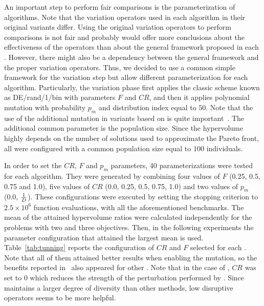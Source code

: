 %
%
%
%
%

An important step to perform fair comparisons is the parameterization of algorithms.
%
Note that the variation operators used in each algorithm in their original variants differ.
%
Using the original variation operators to perform comparisons is not fair and probably would offer more conclusions 
about the effectiveness of the operators than about the general framework proposed in each \MOEA{}.
%
However, there might also be a dependency between the general framework and the proper variation operators.
%
Thus, we decided to use a common simple framework for the variation step but allow different parameterization
for each algorithm.
%
Particularly, the variation phase first applies the classic \DE{} scheme known as DE/rand/1/bin with parameters $F$
and $CR$, and then it applies polynomial mutation with probability $p_m$
and distribution index equal to $50$.
%
Note that the use of the additional mutation in variants based on \MOEAD{} is quite important~\cite{zhang2009performance}.
%
The additional common parameter is the population size.
%
Since the hypervolume highly depends on the number of solutions used to approximate the Pareto front,
all \MOEAS{} were configured with a common population size equal to $100$ individuals.

In order to set the $CR$, $F$ and $p_m$ parameters, 40 parameterizations were tested for each algorithm.
%
They were generated by combining four values of $F$ (0.25, 0.5, 0.75 and 1.0), five values of $CR$ (0.0, 0.25, 0.5, 0.75, 1.0) 
and two values of $p_m$ (0.0, $1\over{D}$).
%
These configurations were executed by setting the stopping criterion to $2.5 \times 10^{6}$ function evaluations, 
with all the aforementioned benchmarks.
%
The mean of the attained hypervolume ratios were calculated independently for the problems with two and three objectives.
%
Then, in the following experiments the parameter configuration that attained the largest mean is used.
%
Table~\ref{tab:tunning} reports the configuration of $CR$ and $F$ selected for each \MOEA{}.
%
Note that all of them attained better results when enabling the mutation, so the benefits reported in~\cite{zhang2009performance}
also appeared for other \MOEAS{}.
%
Note that in the case of \AVSDMOEAD{}, $CR$ was set to 0 which reduces the strength of the perturbation performed
by \DE{}.
%
Since \AVSDMOEAD{} maintains a larger degree of diversity than other methods, low disruptive
operators seems to be more helpful.



